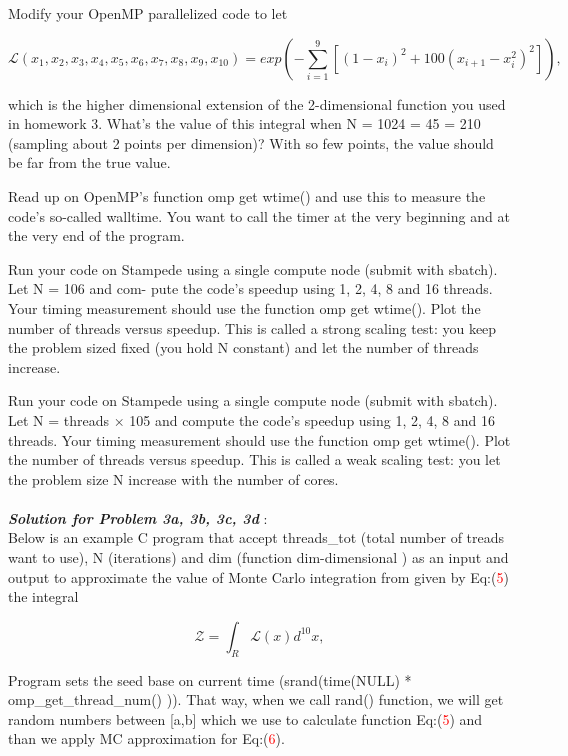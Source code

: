 \documentclass{article}
\begin{document}
Modify your OpenMP parallelized code to let

\begin{equation} \label{exp:eq0}
\mathcal{L}(x_1,x_2,x_3,x_4,x_5,x_6,x_7,x_8,x_9,x_{10})= exp( - \displaystyle\sum_{i=1}^{ 9} [ (1-x_i)^2 + 100(x_{i+1}-x_i^2)^2 ] ) ,
\end{equation}

which is the higher dimensional extension of the 2-dimensional function you used in homework 3. What’s the value of this integral when N = 1024 = 45 = 210 (sampling about 2 points per dimension)? With so few points, the value should be far from the true value.

Read up on OpenMP’s function omp get wtime() and use this to measure the code’s so-called walltime. You want to call the timer at the very beginning and at the very end of the program.

Run your code on Stampede using a single compute node (submit with sbatch). Let N = 106 and com- pute the code’s speedup using 1, 2, 4, 8 and 16 threads. Your timing measurement should use the function omp get wtime(). Plot the number of threads versus speedup. This is called a strong scaling test: you keep the problem sized fixed (you hold N constant) and let the number of threads increase.

Run your code on Stampede using a single compute node (submit with sbatch). Let N = threads × 105 and compute the code’s speedup using 1, 2, 4, 8 and 16 threads. Your timing measurement should use the function omp get wtime(). Plot the number of threads versus speedup. This is called a weak scaling test: you let the problem size N increase with the number of cores.
\\
\\
\textbf{\textit{Solution for Problem 3a, 3b, 3c, 3d}} :
\\
Below is an example C program that accept threads\_tot (total number of treads want to use), N (iterations) and dim (function dim-dimensional )  as an input and output  to approximate the value of Monte Carlo integration from given by Eq:(\textcolor{red}{5}) the integral

\begin{equation} \label{exp:eq0}
 \mathcal{Z}=  \int_{R} \mathcal{L}(x) d^{10}x, 
\end{equation}

Program sets the seed base on current time (srand(time(NULL) * omp\_get\_thread\_num()  )). That way, when we call rand() function, we will get random numbers between [a,b] which we use to calculate function Eq:(\textcolor{red}{5}) and than we apply MC approximation for Eq:(\textcolor{red}{6}).
\end{document}
